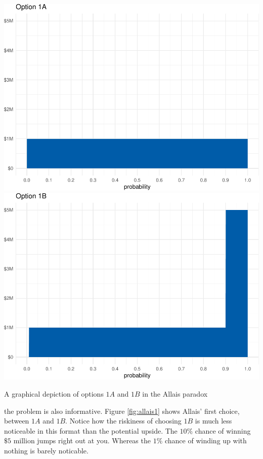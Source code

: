 \documentclass[justified]{tufte-book}
\theoremstyle{definition}
\theoremstyle{definition}
\theoremstyle{definition}
\theoremstyle{remark}
\begin{document}
\begin{marginfigure}
\includegraphics{_main_files/figure-latex/allais1-1} \includegraphics{_main_files/figure-latex/allais1-2} \caption[A graphical depiction of options $1A$ and $1B$ in the Allais paradox]{A graphical depiction of options $1A$ and $1B$ in the Allais paradox}\label{fig:allais1}
\end{marginfigure}

 the problem is also informative. Figure
\ref{fig:allais1} shows Allais' first choice, between \(1A\) and \(1B\).
Notice how the riskiness of choosing \(1B\) is much less noticeable in
this format than the potential upside. The \(10\%\) chance of winning
\(\$5\) million jumps right out at you. Whereas the \(1\%\) chance of
winding up with nothing is barely noticable.
\end{document}
